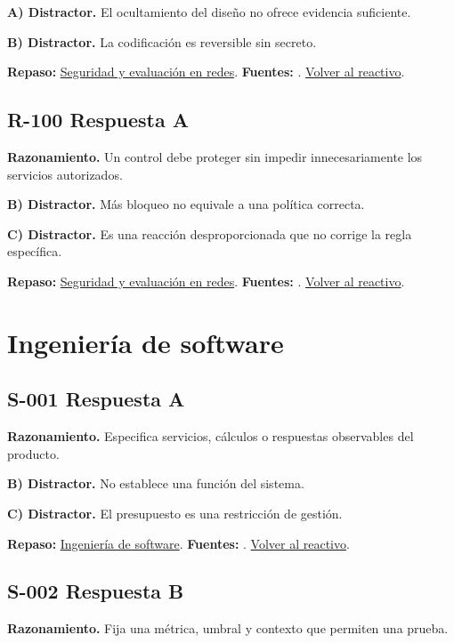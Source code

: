 \textbf{A) Distractor. }El ocultamiento del diseño no ofrece evidencia suficiente.

\textbf{B) Distractor. }La codificación es reversible sin secreto.

\textbf{Repaso:} \hyperref[sec:r3]{Seguridad y evaluación en redes}. \textbf{Fuentes:} \cite{nistsecurity,owasp,aes,tls}. \hyperref[q:R-099]{Volver al reactivo}.\par\medskip

\subsection*{R-100 \quad Respuesta A}\label{s:R-100}
\textbf{Razonamiento.} Un control debe proteger sin impedir innecesariamente los servicios autorizados.

\textbf{B) Distractor. }Más bloqueo no equivale a una política correcta.

\textbf{C) Distractor. }Es una reacción desproporcionada que no corrige la regla específica.

\textbf{Repaso:} \hyperref[sec:r3]{Seguridad y evaluación en redes}. \textbf{Fuentes:} \cite{nistsecurity,owasp,aes,tls}. \hyperref[q:R-100]{Volver al reactivo}.\par\medskip

\section{Ingeniería de software}

\subsection*{S-001 \quad Respuesta A}\label{s:S-001}
\textbf{Razonamiento.} Especifica servicios, cálculos o respuestas observables del producto.

\textbf{B) Distractor. }No establece una función del sistema.

\textbf{C) Distractor. }El presupuesto es una restricción de gestión.

\textbf{Repaso:} \hyperref[sec:s1]{Ingeniería de software}. \textbf{Fuentes:} \cite{scrum,swebok}. \hyperref[q:S-001]{Volver al reactivo}.\par\medskip

\subsection*{S-002 \quad Respuesta B}\label{s:S-002}
\textbf{Razonamiento.} Fija una métrica, umbral y contexto que permiten una prueba.

